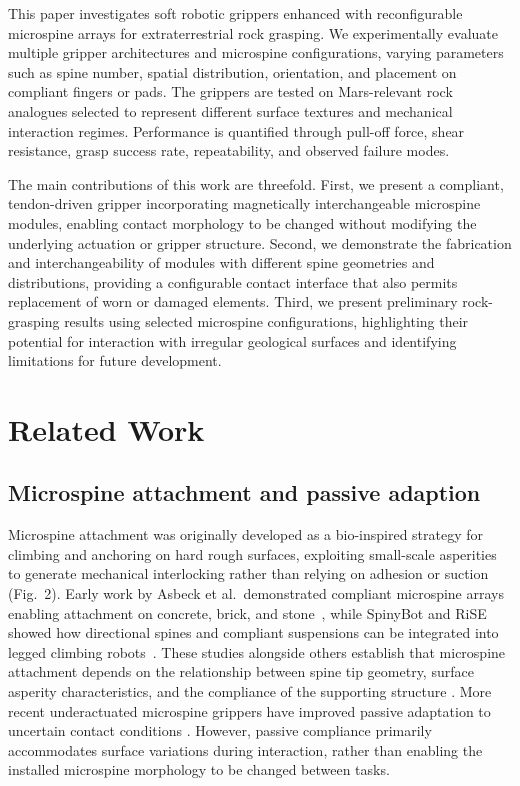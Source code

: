 \documentclass[letterpaper, 10 pt, conference, twoside]{ieeetran}
\begin{document}

This paper investigates soft robotic grippers enhanced with reconfigurable microspine arrays for extraterrestrial rock grasping. We experimentally evaluate multiple gripper architectures and microspine configurations, varying parameters such as spine number, spatial distribution, orientation, and placement on compliant fingers or pads. The grippers are tested on Mars-relevant rock analogues selected to represent different surface textures and mechanical interaction regimes. Performance is quantified through pull-off force, shear resistance, grasp success rate, repeatability, and observed failure modes.

The main contributions of this work are threefold. First, we present a compliant, tendon-driven gripper incorporating magnetically interchangeable microspine modules, enabling contact morphology to be changed without modifying the underlying actuation or gripper structure. Second, we demonstrate the fabrication and interchangeability of modules with different spine geometries and distributions, providing a configurable contact interface that also permits replacement of worn or damaged elements. Third, we present preliminary rock-grasping results using selected microspine configurations, highlighting their potential for interaction with irregular geological surfaces and identifying limitations for future development.


\section{Related Work}

\subsection{Microspine attachment and passive adaption}

Microspine attachment was originally developed as a bio-inspired strategy for climbing and anchoring on hard rough surfaces, exploiting small-scale asperities to generate mechanical interlocking rather than relying on adhesion or suction (Fig.~2). Early work by Asbeck et al.\ demonstrated compliant microspine arrays enabling attachment on concrete, brick, and stone~\cite{Asbeck2006IJRR}, while SpinyBot and RiSE showed how directional spines and compliant suspensions can be integrated into legged climbing robots~\cite{Kim2005SpinybotII,Spenko2008RiSE}. These studies alongside others establish that microspine attachment depends on the relationship between spine tip geometry, surface asperity characteristics, and the compliance of the supporting structure \cite{Jiang2018StochasticModels}. More recent underactuated microspine grippers have improved passive adaptation to uncertain contact conditions \cite{Li2023MicrospineGripper}. However, passive compliance primarily accommodates surface variations during interaction, rather than enabling the installed microspine morphology to be changed between tasks.
\end{document}
